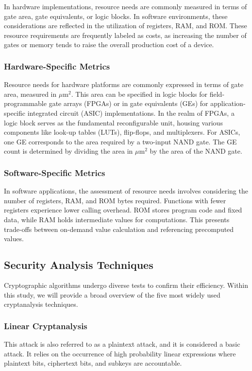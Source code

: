 \documentclass[conference,compsoc]{IEEEtran}
\begin{document}
In hardware implementations, resource needs are commonly measured in terms of gate area, gate equivalents, or logic blocks. In software environments, these considerations are reflected in the utilization of registers, RAM, and ROM. These resource requirements are frequently labeled as costs, as increasing the number of gates or memory tends to raise the overall production cost of a device.
\subsubsection{Hardware-Specific Metrics} 
Resource needs for hardware platforms are commonly expressed in terms of gate area, measured in \(\mu \text{m}^2\). This area can be specified in logic blocks for field-programmable gate arrays (FPGAs) or in gate equivalents (GEs) for application-specific integrated circuit (ASIC) implementations.
In the realm of FPGAs, a logic block serves as the fundamental reconfigurable unit, housing various components like look-up tables (LUTs), flip-flops, and multiplexers.
For ASICs, one GE corresponds to the area required by a two-input NAND gate. The GE count is determined by dividing the area in \(\mu \text{m}^2\) by the area of the NAND gate.
\subsubsection{Software-Specific Metrics} 
In software applications, the assessment of resource needs involves considering the number of registers, RAM, and ROM bytes required. Functions with fewer registers experience lower calling overhead. ROM stores program code and fixed data, while RAM holds intermediate values for computations. This presents trade-offs between on-demand value calculation and referencing precomputed values.
\subsection{Security Analysis Techniques}
Cryptographic algorithms undergo diverse tests to confirm their efficiency. Within this study, we will provide a broad overview of the five most widely used cryptanalysis techniques.
\subsubsection{Linear Cryptanalysis} 
This attack is also referred to as a plaintext attack, and it is considered a basic attack. It relies on the occurrence of high probability linear expressions where plaintext bits, ciphertext bits, and subkeys are accountable.
\end{document}
